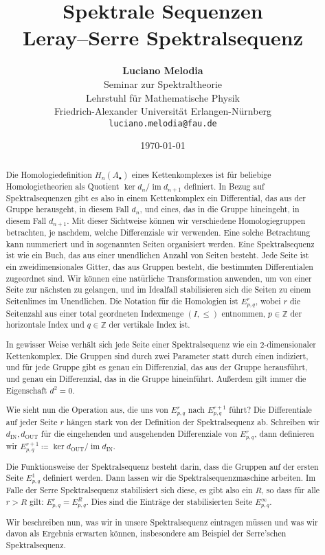 \documentclass[12pt, hidelinks]{article}
\title{\textbf{Spektrale Sequenzen\\ Leray–Serre Spektralsequenz}}
\author{
\textbf{Luciano Melodia} \\
Seminar zur Spektraltheorie \\
Lehrstuhl für Mathematische Physik \\
Friedrich-Alexander Universität Erlangen-Nürnberg \\
\texttt{luciano.melodia@fau.de}}
\date{\today}
\numberwithin{conj}{section}
\newcommand{\ima}{\operatorname{im}}
\begin{document}
\hypersetup{bookmarksnumbered=true,}
\maketitle

\begin{abstract}
Die Homologiedefinition $H_n(A_\bullet)$ eines Kettenkomplexes ist für beliebige Homologietheorien als Quotient $\ker d_n/\ima d_{n+1}$ definiert. In Bezug auf Spektralsequenzen gibt es also in einem Kettenkomplex ein Differential, das aus der Gruppe herausgeht, in diesem Fall $d_n$, und eines, das in die Gruppe hineingeht, in diesem Fall $d_{n+1}$. Mit dieser Sichtweise können wir verschiedene Homologiegruppen betrachten, je nachdem, welche Differenziale wir verwenden. Eine solche Betrachtung kann nummeriert und in sogenannten Seiten organisiert werden. Eine Spektralsequenz ist wie ein Buch, das aus einer unendlichen Anzahl von Seiten besteht. Jede Seite ist ein zweidimensionales Gitter, das aus Gruppen besteht, die bestimmten Differentialen zugeordnet sind. Wir können eine natürliche Transformation anwenden, um von einer Seite zur nächsten zu gelangen, und im Idealfall stabilisieren sich die Seiten zu einem Seitenlimes im Unendlichen. Die Notation für die Homologien ist $E^r_{p,q}$, wobei $r$ die Seitenzahl aus einer total geordneten Indexmenge $(I,\leq)$ entnommen, $p \in \mathbb{Z}$ der horizontale Index und $q \in \mathbb{Z}$ der vertikale Index ist.

In gewisser Weise verhält sich jede Seite einer Spektralsequenz wie ein $2$-dimensionaler Kettenkomplex. Die Gruppen sind durch zwei Parameter statt durch einen indiziert, und für jede Gruppe gibt es genau ein Differenzial, das aus der Gruppe herausführt, und genau ein Differenzial, das in die Gruppe hineinführt. Außerdem gilt immer die Eigenschaft $d^2 = 0$.

Wie sieht nun die Operation aus, die uns von $E^r_{p,q}$ nach $E^{r+1}_{p,q}$ führt? Die Differentiale auf jeder Seite $r$ hängen stark von der Definition der Spektralsequenz ab. Schreiben wir $d_{\operatorname{IN}},d_{\operatorname{OUT}}$ für die eingehenden und ausgehenden Differenziale von $E^r_{p,q}$, dann definieren wir $E^{r+1}_{p,q} \coloneq \ker d_{\operatorname{OUT}} / \ima d_{\operatorname{IN}}$.

Die Funktionsweise der Spektralsequenz besteht darin, dass die Gruppen auf der ersten Seite $E^1_{p,q}$ definiert werden. Dann lassen wir die Spektralsequenzmaschine arbeiten. Im Falle der Serre Spektralsequenz stabilisiert sich diese, es gibt also ein $R$, so dass für alle $r > R$ gilt: $E^r_{p,q} = E^R_{p,q}$. Dies sind die Einträge der stabilisierten Seite $E^\infty_{p,q}$.

Wir beschreiben nun, was wir in unsere Spektralsequenz eintragen müssen und was wir davon als Ergebnis erwarten können, insbesondere am Beispiel der Serre'schen Spektralsequenz.
\end{abstract}
\end{document}

